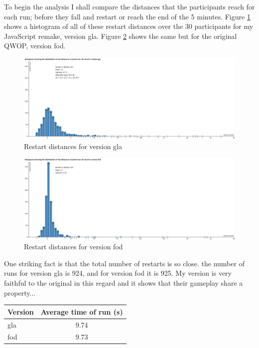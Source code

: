 \documentclass[12pt,a4paper,twoside,openright]{report}
\begin{document}
To begin the analysis I shall compare the distances that the participants reach for each run; before they fall and restart or reach the end of the 5 minutes. Figure \ref{glaRestarts} shows a histogram of all of these restart distances over the 30 participants for my JavaScript remake, version gla. Figure \ref{fodRestarts} shows the same but for the original QWOP, version fod.

\begin{figure}[tbh]
\centerline{\includegraphics[scale=0.39]{glaRestarts.PNG}}
\caption{Restart distances for version gla}
\label{glaRestarts}
\end{figure}
\begin{figure}[tbh]
\centerline{\includegraphics[scale=0.39]{fodRestarts.PNG}}
\caption{Restart distances for version fod}
\label{fodRestarts}
\end{figure}

One striking fact is that the total number of restarts is so close. the number of runs for version gla is 924, and for version fod it is 925. My version is very faithful to the original in this regard and it shows that their gameplay share a property...


\begin{center}
\begin{tabular}{ |p{3cm}|c| }
  \hline
Version& Average time of run (s)\\ \hline
gla & 9.74 \\ \hline
fod & 9.73 \\ \hline
\end{tabular}
\end{center}
\end{document}
